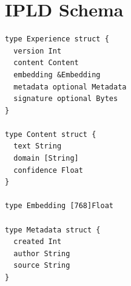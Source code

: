 \section{IPLD Schema}


\begin{lstlisting}[caption=IPLD Schema Definition]
type Experience struct {
  version Int
  content Content
  embedding &Embedding
  metadata optional Metadata
  signature optional Bytes
}

type Content struct {
  text String
  domain [String]
  confidence Float
}

type Embedding [768]Float

type Metadata struct {
  created Int
  author String
  source String
}
\end{lstlisting}

